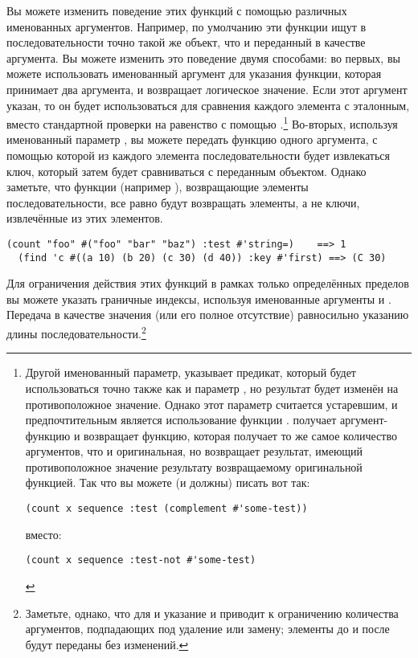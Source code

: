 Вы можете изменить поведение этих функций с помощью различных именованных аргументов.
Например, по умолчанию эти функции ищут в последовательности точно такой же объект, что и
переданный в качестве аргумента.  Вы можете изменить это поведение двумя способами: во
первых, вы можете использовать именованный аргумент  для указания функции,
которая принимает два аргумента, и возвращает логическое значение.  Если этот аргумент
указан, то он будет использоваться для сравнения каждого элемента с эталонным, вместо стандартной
проверки на равенство с помощью .\footnote{Другой именованный параметр,
   указывает предикат, который будет использоваться точно также как и
  параметр , но результат будет изменён на
  противоположное значение.  Однако этот параметр считается устаревшим, и предпочтительным
  является использование функции .   получает
  аргумент-функцию и возвращает функцию, которая получает то же самое количество
  аргументов, что и оригинальная, но возвращает результат, имеющий противоположное
  значение результату возвращаемому оригинальной функцией.  Так что вы можете (и должны)
  писать вот так:

\begin{lstlisting}[style=lisprepl]
  (count x sequence :test (complement #'some-test))
\end{lstlisting}

\noindent{}вместо:

\begin{lstlisting}[style=lisprepl]
  (count x sequence :test-not #'some-test)
\end{lstlisting}

} Во-вторых, используя именованный параметр , вы можете передать функцию одного
аргумента, с помощью которой из каждого элемента последовательности будет извлекаться ключ,
который затем будет сравниваться с переданным объектом.  Однако заметьте, что
функции (например ), возвращающие элементы последовательности, все равно будут
возвращать элементы, а не ключи, извлечённые из этих элементов.

\begin{lstlisting}[style=lisprepl]
  (count "foo" #("foo" "bar" "baz") :test #'string=)    ==> 1
  (find 'c #((a 10) (b 20) (c 30) (d 40)) :key #'first) ==> (C 30)
\end{lstlisting}

Для ограничения действия этих функций в рамках только определённых пределов вы можете
указать граничные индексы, используя именованные аргументы  и .
Передача  в качестве значения  (или его полное отсутствие)
равносильно указанию длины последовательности.\footnote{Заметьте, однако, что для
   и  указание  и  приводит к
  ограничению количества аргументов, подпадающих под удаление или замену; элементы до
   и после  будут переданы без изменений.}

